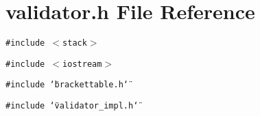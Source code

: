 \section{validator.h File Reference}
\label{validator_8h}
{\tt \#include $<$stack$>$}\par
{\tt \#include $<$iostream$>$}\par
{\tt \#include \char`\"{}brackettable.h\char`\"{}}\par
{\tt \#include \char`\"{}validator\_\-impl.h\char`\"{}}\par
